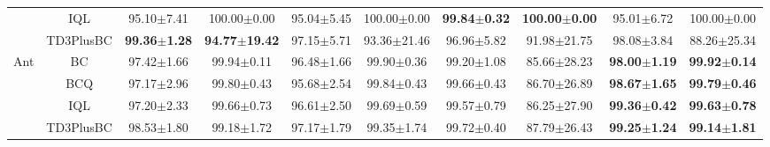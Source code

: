 \begin{table}[!ht]
\begin{tabular}{cccccccccc}
                                                                                           & IQL                                                                                        & 95.10$\pm$7.41          & 100.00$\pm$0.00          & 95.04$\pm$5.45 & 100.00$\pm$0.00 & \textbf{99.84$\pm$0.32} & \textbf{100.00$\pm$0.00}            & 95.01$\pm$6.72          & 100.00$\pm$0.00                           \\
                                                                                           & TD3PlusBC                                                                                  & \textbf{99.36$\pm$1.28} & \textbf{94.77$\pm$19.42} & 97.15$\pm$5.71 & 93.36$\pm$21.46 & 96.96$\pm$5.82          & 91.98$\pm$21.75                     & 98.08$\pm$3.84          & 88.26$\pm$25.34                           \\ 
    \cline{2-10}
    \multirow{4}{*}{Ant}                                                                   & BC                                                                                         & 97.42$\pm$1.66          & 99.94$\pm$0.11           & 96.48$\pm$1.66 & 99.90$\pm$0.36  & 99.20$\pm$1.08          & 85.66$\pm$28.23                     & \textbf{98.00$\pm$1.19} & \textbf{99.92$\pm$0.14}                   \\
                                                                                           & BCQ                                                                                        & 97.17$\pm$2.96          & 99.80$\pm$0.43           & 95.68$\pm$2.54 & 99.84$\pm$0.43  & 99.66$\pm$0.43          & 86.70$\pm$26.89                     & \textbf{98.67$\pm$1.65} & \textbf{99.79$\pm$0.46}                   \\
                                                                                           & IQL                                                                                        & 97.20$\pm$2.33          & 99.66$\pm$0.73           & 96.61$\pm$2.50 & 99.69$\pm$0.59  & 99.57$\pm$0.79          & 86.25$\pm$27.90                     & \textbf{99.36$\pm$0.42} & \textbf{99.63$\pm$0.78}                   \\
                                                                                           & TD3PlusBC                                                                                  & 98.53$\pm$1.80          & 99.18$\pm$1.72           & 97.17$\pm$1.79 & 99.35$\pm$1.74  & 99.72$\pm$0.40          & 87.79$\pm$26.43                     & \textbf{99.25$\pm$1.24} & \textbf{99.14$\pm$1.81}                   \\
    \bottomrule
    \end{tabular}
    \end{table}
    
